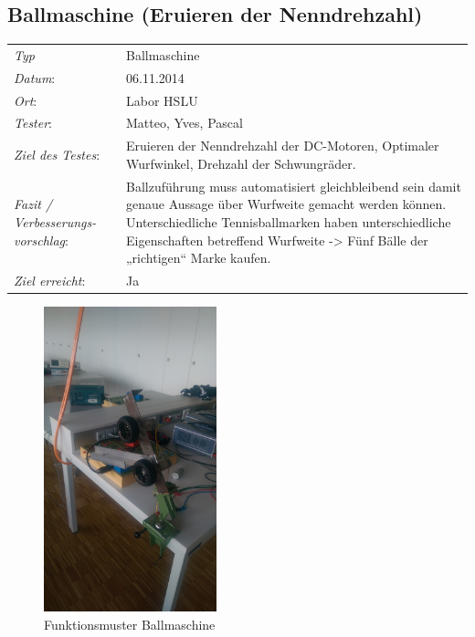 \subsection{Ballmaschine (Eruieren der Nenndrehzahl)}

\begin{tabular}{p{3.6cm}p{9.4cm}}
\textit{Typ}              & Ballmaschine \\ 
\textit{Datum}:           & 06.11.2014   \\
\textit{Ort}:             & Labor HSLU \\
\textit{Tester}:          &  Matteo, Yves, Pascal\\
\textit{Ziel des Testes}: & Eruieren der Nenndrehzahl der DC-Motoren, Optimaler Wurfwinkel, Drehzahl der Schwungräder.  \\
\textit{Fazit / Verbesserungs-\newline vorschlag}: & Ballzuführung muss automatisiert gleichbleibend sein damit genaue Aussage über Wurfweite gemacht werden können. 
Unterschiedliche Tennisballmarken haben unterschiedliche Eigenschaften betreffend Wurfweite -> Fünf Bälle der „richtigen“ Marke kaufen. \\
\textit{Ziel erreicht}:& Ja\\
\end{tabular}
\begin{figure}[h!]
	\includegraphics[width=5cm]{Funktionstests/Bilder/Ballmaschine_Drehzahl1.jpg}
	\centering
	\caption{Funktionsmuster Ballmaschine} 
\label{abb:Ballmaschine_Drehzahl}
\end{figure}